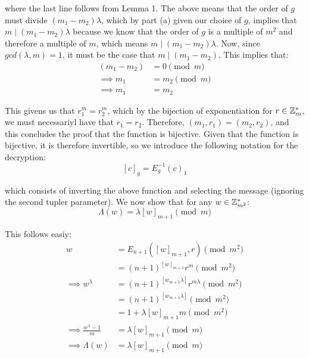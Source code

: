 \documentclass{article}
\begin{document}
\begin{enumerate}
\begin{itemize}
where the last line follows from Lemma 1. The above means that the order of $g$ must divide
$(m_1 - m_2)\lambda$, which by part (a) given our choice of $g$, implies that $m \mid (m_1 - m_2)\lambda$
because we know that the order of $g$ is a multiple of $m^2$ and therefore a multiple of $m$,
which means $m \mid (m_1 - m_2) \lambda$. Now, since $gcd(\lambda,m) = 1$, it must be the 
case that $m \mid (m_1 - m_2)$. This implies that:%
\noindent\noindent\[%
\begin{aligned}
(m_1 - m_2) &= 0 \pmod m \\
\implies m_1 &= m_2 \pmod m \\
\implies m_1 &= m_2
\end{aligned}
\]%

This givens us that $r_1^m = r_2^m$, which by the bijection of exponentiation for $r \in \mathbb{Z}^*_m$,
we must necessariyl have that $r_1 = r_2$. Therefore, $(m_1,r_1) = (m_2, r_2)$, and this concludes
the proof that the function is bijective. Given that the function is bijective, it is therefore
invertible, so we introduce the following notation for the decryption:%
\noindent\noindent\[%
[c]_g = E_g^{-1}(c)_1
\]%

which consists of inverting the above function and selecting the message (ignoring the second tupler
parameter). We now show that for any $w \in \mathbb{Z}_{m^2}^*$:%
\noindent\noindent\[%
\Lambda(w) = \lambda [w]_{m+1} \pmod {m}
\]%

This follows easiy:%
\noindent\noindent\[%
\begin{aligned}
  w &= E_{n+1}([w]_{m+1}, r) \pmod{m^2} \\ 
  &= (n+1)^{[w]_{m+1}}r^m \pmod{m^2} \\
  \implies w^{\lambda} &= (n+1)^{[w_{m+1}\lambda]}r^{m\lambda} \pmod{m^2} \\
  &= (n+1)^{[w_{m+1}\lambda]} \pmod{m^2} \\
  &= 1 + \lambda[w]_{m+1}m \pmod{m^2} \\
  \implies \frac{w^{\lambda} - 1}{m} &= \lambda[w]_{m+1} \pmod m \\
  \implies \Lambda(w) &= \lambda[w]_{m+1} \pmod m 
\end{aligned} 
\]%


\end{itemize}
\end{enumerate}
\end{document}
